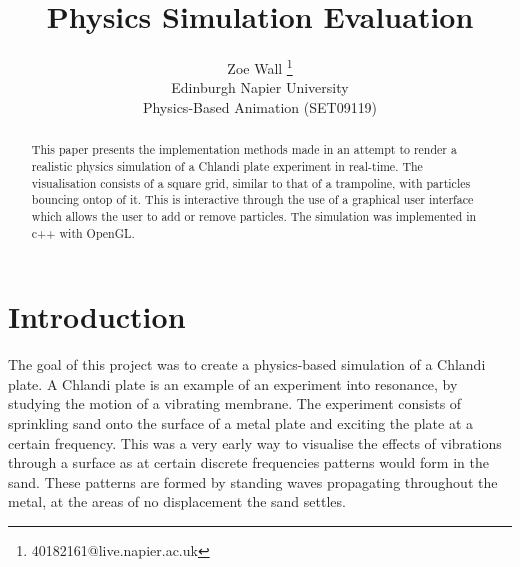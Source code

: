 \documentclass[conference,backref=page]{acmsiggraph}
\title{Physics Simulation Evaluation}
\author{Zoe Wall
 \thanks{40182161@live.napier.ac.uk} \\
Edinburgh Napier University\\
Physics-Based Animation (SET09119)}
\begin{document}

\maketitle

\raggedbottom

\begin{abstract}
This paper presents the implementation methods made in an attempt to render a realistic physics simulation of a Chlandi plate experiment in real-time. The visualisation consists of a square grid, similar to that of a trampoline, with particles bouncing ontop of it. This is interactive through the use of a graphical user interface which allows the user to add or remove particles. The simulation was implemented in c++ with OpenGL. 	

\end{abstract}



\keywordlist





\section{Introduction}

The goal of this project was to create a physics-based simulation of a Chlandi plate. A Chlandi plate is an example of an experiment into resonance, by studying the motion of a vibrating membrane. The experiment consists of sprinkling sand onto the surface of a metal plate and exciting the plate at a certain frequency. This was a very early way to visualise the effects of vibrations through a surface as at certain discrete frequencies patterns would form in the sand. These patterns are formed by standing waves propagating throughout the metal, at the areas of no displacement the sand settles.
\end{document}
